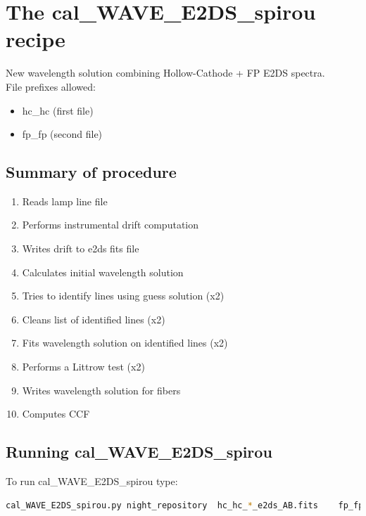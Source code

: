 \section{The cal\_WAVE\_E2DS\_spirou recipe}
\label{section:cal_WAVE_E2DS_spirou}

New wavelength solution combining Hollow-Cathode + FP E2DS spectra. \\


\noindent File prefixes allowed:
\begin{itemize}
	\item hc\_hc (first file)
	\item fp\_fp (second file)
\end{itemize}

\subsection{Summary of procedure}
\begin{enumerate}
	\item Reads lamp line file
	\item Performs instrumental drift computation
	\item Writes drift to e2ds fits file
	\item Calculates initial wavelength solution
	\item Tries to identify lines using guess solution (x2) 
	\item Cleans list of identified lines (x2)
	\item Fits wavelength solution on identified lines (x2)
	\item Performs a Littrow test (x2)
	\item Writes wavelength solution for fibers
	\item Computes CCF
\end{enumerate}

\subsection{Running cal\_WAVE\_E2DS\_spirou}

To run cal\_WAVE\_E2DS\_spirou type:
\begin{lstlisting}[language=bash, style=bashstyle]
cal_WAVE_E2DS_spirou.py night_repository  hc_hc_*_e2ds_AB.fits    fp_fp_*_e2ds_AB.fits 
\end{lstlisting}


